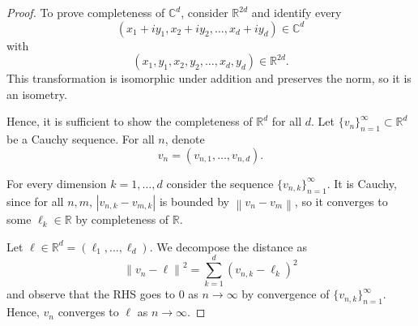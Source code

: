 \documentclass[oneside]{article}
\newcommand\abs[1]{\left|#1\right|}
\newcommand\norm[1]{\left\|#1\right\|}
\newcommand\bbC{\mathbb{C}}
\newcommand\bbR{\mathbb{R}}
\begin{document}
  \begin{proof}
    To prove completeness of $\bbC^d$, consider $\bbR^{2d}$ and identify every\[
      (x_1+i y_1, x_2 +iy_2, \dots, x_d + iy_d) \in \bbC^d
    \] with \[
      (x_1, y_1, x_2, y_2, \dots, x_d, y_d) \in \bbR^{2d} \text{.}
    \] This transformation is isomorphic under addition and preserves the norm, so it is an isometry.

    Hence, it is sufficient to show the completeness of $\bbR^d$ for all $d$. Let $\{v_n\}_{n=1}^\infty \subset \bbR^d$ be a Cauchy sequence. For all $n$, denote\[
      v_n = (v_{n,1}, \dots, v_{n,d}) \text{.}
    \]

    For every dimension $k=1, \dots, d$ consider the sequence $\{v_{n,k}\}_{n=1}^\infty$. It is Cauchy, since for all $n, m$, $\abs{v_{n,k} - v_{m,k}}$ is bounded by $\norm{v_n - v_m}$, so it converges to some $\ell_k \in \bbR$ by completeness of $\bbR$.

    Let $\ell \in \bbR^d = (\ell_1, \dots, \ell_d)$. We decompose the distance as\[
      \norm{v_n - \ell}^2 = \sum_{k=1}^d (v_{n,k} - \ell_k)^2
    \] and observe that the RHS goes to 0 as $n \to \infty$ by convergence of $\{v_{n,k}\}_{n=1}^\infty$. Hence, $v_n$ converges to $\ell$ as $n \to \infty$.
  \end{proof}
\end{document}
